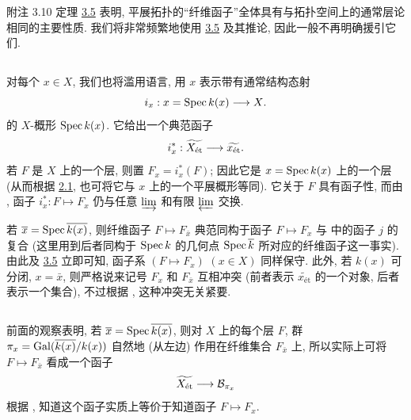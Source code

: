 \begin{enonce*}[remark]{附注 3.10}
定理 \hyperref[VIII.thm3.5]{3.5} 表明,
平展拓扑的“纤维函子”全体具有与拓扑空间上的通常层论相同的主要性质.
我们将非常频繁地使用 \hyperref[VIII.thm3.5]{3.5} 及其推论,
因此一般不再明确援引它们.
\end{enonce*}

\setcounter{subsection}{10}
\subsection{}

对每个 $x \in X$, 我们也将滥用语言,
用 $x$ 表示带有通常结构态射
$$
i_x : x = \Spec k(x) \to X{\quoi}.
$$
的 $X$-概形 $\operatorname{Spec} k(x)$.
它给出一个典范函子
$$
i_x^{\ast} : \widetilde{X_{\text{ét}}} \to \widetilde{x_{\text{ét}}}{\quoi}.
$$
若 $F$ 是 $X$ 上的一个层, 则置 $F_x = i^{\ast}_x (F)$;
因此它是 $x = \operatorname{Spec} k(x)$ 上的一个层
(从而根据 \hyperref[VIII.prop2.1]{2.1},
也可将它与 $x$ 上的一个\pageoriginale 平展概形等同).
它关于 $F$ 具有函子性, 而由 ,
函子 $i^{\ast}_x : F \mapsto F_x$ 仍与任意 $\varinjlim$ 和有限 $\varprojlim$ 交换.

若 $\overline{x} = \operatorname{Spec} \overline{k(x)}$,
则纤维函子 $F \mapsto F_{\bar{x}}$ 典范同构于函子 $F \mapsto F_x$
与 
中的函子 $j$ 的复合
(这里用到后者同构于 $\operatorname{Spec} k$ 的几何点 $\operatorname{Spec} \overline{k}$ 所对应的纤维函子这一事实).
由此及 \hyperref[VIII.thm3.5]{3.5} 立即可知,
函子系 $(F \mapsto F_x)$ $(x \in X)$ 同样保守.
此外, 若 $k(x)$ 可分闭, \ie $x = \bar{x}$,
则严格说来记号 $F_x$ 和 $F_{\bar{x}}$ 互相冲突
(前者表示 $\widetilde{x_{\text{ét}}}$ 的一个对象, 后者表示一个集合),
不过根据 ,
这种冲突无关紧要.

\subsection{}

前面的观察表明, 若 $\overline{x} = \operatorname{Spec} \overline{k(x)}$,
则对 $X$ 上的每个层 $F$, 群 $\pi_x = \operatorname{Gal} (\overline{k(x)}/ k(x))$
自然地 (从左边) 作用在纤维集合 $F_{\bar{x}}$ 上,
所以实际上可将 $F \mapsto F_{\bar{x}}$ 看成一个函子
$$
\widetilde{X_{\text{ét}}} \to \Bb_{\pi_x}
$$
根据 ,
知道这个函子实质上等价于知道函子 $F \mapsto F_x$.

